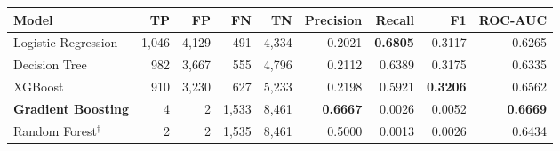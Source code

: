 \begin{tabular}{@{}lrrrrrrrr@{}}
\toprule
\textbf{Model} & \textbf{TP} & \textbf{FP} & \textbf{FN} & \textbf{TN} & \textbf{Precision} & \textbf{Recall} & \textbf{F1} & \textbf{ROC-AUC} \\
\midrule
Logistic Regression & 1,046 & 4,129 & 491 & 4,334 & 0.2021 & \textbf{0.6805} & 0.3117 & 0.6265 \\
Decision Tree & 982 & 3,667 & 555 & 4,796 & 0.2112 & 0.6389 & 0.3175 & 0.6335 \\
XGBoost & 910 & 3,230 & 627 & 5,233 & 0.2198 & 0.5921 & \textbf{0.3206} & 0.6562 \\
\textbf{Gradient Boosting} & 4 & 2 & 1,533 & 8,461 & \textbf{0.6667} & 0.0026 & 0.0052 & \textbf{0.6669} \\
Random Forest$^\dagger$ & 2 & 2 & 1,535 & 8,461 & 0.5000 & 0.0013 & 0.0026 & 0.6434 \\
\bottomrule
\end{tabular}
